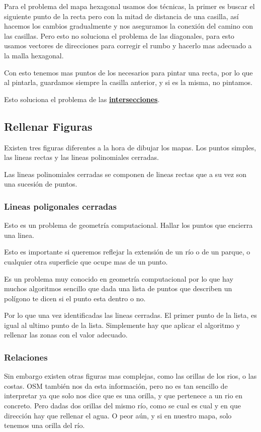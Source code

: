 Para el problema del mapa hexagonal usamos dos técnicas, la primer es buscar el
siguiente punto de la recta pero con la mitad de distancia de una casilla, así
hacemos los cambios gradualmente y nos aseguramos la conexión del camino con
las casillas.
Pero esto no soluciona el problema de las diagonales, para esto usamos vectores
de direcciones para corregir el rumbo y hacerlo mas adecuado a la malla
hexagonal.

Con esto tenemos mas puntos de los necesarios para pintar una recta, por lo que
al pintarla, guardamos siempre la casilla anterior, y si es la misma, no
pintamos. 

Esto soluciona el problema de las \hyperref[Intersecciones]
{\bf intersecciones}.
\subsection*{Rellenar Figuras}
Existen tres figuras diferentes a la hora de dibujar los mapas.
Los puntos simples, las lineas rectas y las lineas polinomiales cerradas.

Las lineas polinomiales cerradas se componen de lineas rectas que a su vez son
una sucesión de puntos.

\subsubsection*{Lineas poligonales cerradas}
Esto es un problema de geometría computacional. Hallar los puntos que encierra
una linea.

Esto es importante si queremos reflejar la extensión de un río o de un parque,
o cualquier otra superficie que ocupe mas de un punto.

Es un problema muy conocido en geometría computacional por lo que hay muchos
algoritmos sencillo que dada una lista de
puntos que describen un polígono te dicen si el punto esta dentro o no.

Por lo que una vez identificadas las lineas cerradas. El primer punto de la
lista, es igual al ultimo punto de la lista. Simplemente hay que aplicar el
algoritmo y rellenar las zonas con el valor adecuado.
\subsubsection*{Relaciones}
Sin embargo existen otras figuras mas complejas, como las orillas de los rios,
o las costas. OSM también nos da esta información, pero no es tan sencillo de
interpretar ya que solo nos dice que es una orilla, y que pertenece a un rio en
concreto.
Pero dadas dos orillas del mismo río, como se cual es cual y en que dirección
hay que rellenar el agua. O peor aún, y si en nuestro mapa, solo tenemos una
orilla del río.


